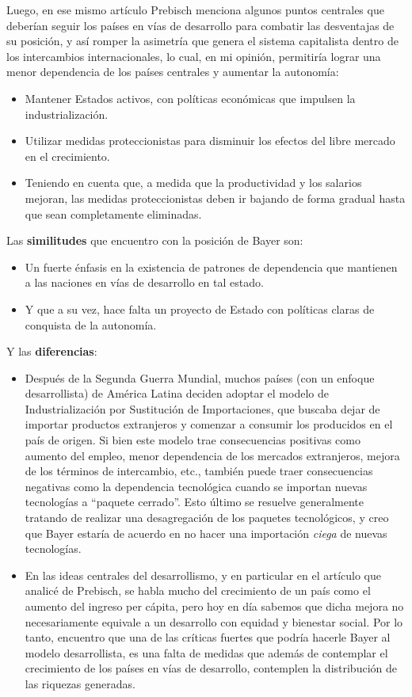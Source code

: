 Luego, en ese mismo artículo Prebisch menciona algunos puntos centrales que deberían seguir los países en vías de desarrollo para combatir las desventajas de su posición, y así romper la asimetría que genera el sistema capitalista dentro de los intercambios internacionales, lo cual, en mi opinión, permitiría lograr una menor dependencia de los países centrales y aumentar la autonomía:

 \begin{itemize}
     \item Mantener Estados activos, con políticas económicas que impulsen la industrialización.
     \item Utilizar medidas proteccionistas para disminuir los efectos del libre mercado en el crecimiento.
     \item Teniendo en cuenta que, a medida que la productividad y los salarios mejoran, las medidas proteccionistas deben ir bajando de forma gradual hasta que sean completamente eliminadas.
 \end{itemize}

 Las \textbf{similitudes} que encuentro con la posición de Bayer son:

 \begin{itemize}
     \item Un fuerte énfasis en la existencia de patrones de dependencia que mantienen a las naciones en vías de desarrollo en tal estado.
     \item Y que a su vez, hace falta un proyecto de Estado con políticas claras de conquista de la autonomía.
 \end{itemize}

 Y las \textbf{diferencias}:

 \begin{itemize}
     \item Después de la Segunda Guerra Mundial, muchos países (con un enfoque desarrollista) de América Latina deciden adoptar el modelo de Industrialización por Sustitución de Importaciones, que buscaba dejar de importar productos extranjeros y comenzar a consumir los producidos en el país de origen. Si bien este modelo trae consecuencias positivas como aumento del empleo, menor dependencia de los mercados extranjeros, mejora de los términos de intercambio, etc., también puede traer consecuencias negativas como la dependencia tecnológica cuando se importan nuevas tecnologías a ``paquete cerrado''. Esto último se resuelve generalmente tratando de realizar una desagregación de los paquetes tecnológicos, y creo que Bayer estaría de acuerdo en no hacer una importación \textit{ciega} de nuevas tecnologías.
     \item En las ideas centrales del desarrollismo, y en particular en el artículo que analicé de Prebisch, se habla mucho del crecimiento de un país como el aumento del ingreso per cápita, pero hoy en día sabemos que dicha mejora no necesariamente equivale a un desarrollo con equidad y bienestar social. Por lo tanto, encuentro que una de las críticas fuertes que podría hacerle Bayer al modelo desarrollista, es una falta de medidas que además de contemplar el crecimiento de los países en vías de desarrollo, contemplen la distribución de las riquezas generadas.
 \end{itemize}

